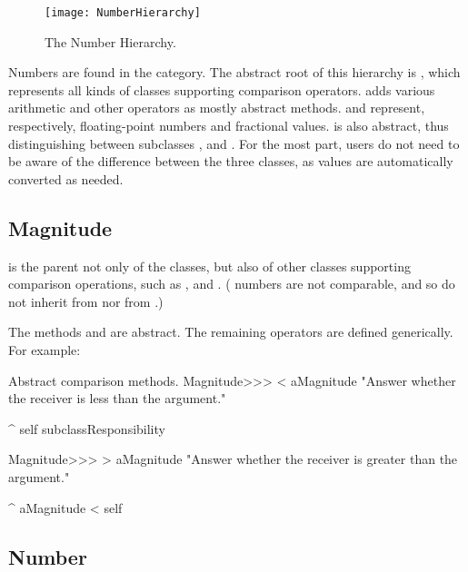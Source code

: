 \documentclass[a4paper,10pt,twoside]{book}
\begin{document}
\begin{figure}[ht]
\centerline {\texttt{[image: NumberHierarchy]}}
\caption{The Number Hierarchy.\label{fig:numbers}}
\end{figure}

Numbers are found in the  category.
The abstract root of this hierarchy is , which represents all kinds of classes supporting comparison operators.
 adds various arithmetic and other operators as mostly abstract methods.  and  represent, respectively, floating-point numbers and fractional values.
 is also abstract, thus distinguishing between subclasses ,  and .
For the most part, users do not need to be aware of the difference between the three  classes, as values are automatically converted as needed.

\subsection{Magnitude}

 is the parent not only of the  classes, but also of other classes supporting comparison operations, such as ,  and .
( numbers are not comparable, and so do not inherit from  nor from .)

The methods  and  are abstract.
The remaining operators are defined generically.
For example:

\begin{method}{Abstract comparison methods.}
Magnitude>>> < aMagnitude
    "Answer whether the receiver is less than the argument."

    ^ self subclassResponsibility


Magnitude>>> > aMagnitude
    "Answer whether the receiver is greater than the argument."

    ^ aMagnitude < self
\end{method}

\subsection{Number}
\end{document}
